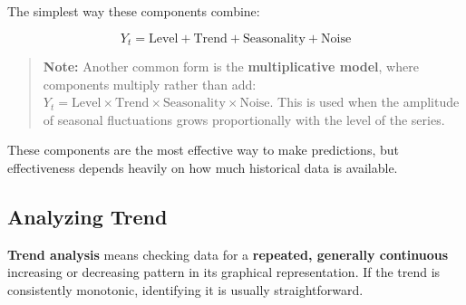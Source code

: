 \documentclass[12pt,openany]{book}
\begin{document}
The simplest way these components combine:

\begin{equation*}
    \boxed{Y_t = \text{Level} + \text{Trend} + \text{Seasonality} + \text{Noise}}
\end{equation*}


\begin{center}
\end{center}


\begin{quote}
\textbf{Note:} Another common form is the \textbf{multiplicative model}, where components multiply rather than add: \(Y_t = \text{Level} \times \text{Trend} \times \text{Seasonality} \times \text{Noise}\). This is used when the amplitude of seasonal fluctuations grows proportionally with the level of the series.\par

\end{quote}

These components are the most effective way to make predictions, but effectiveness depends heavily on how much historical data is available.

\subsection{Analyzing Trend}

\textbf{Trend analysis} means checking data for a \textbf{repeated, generally continuous} increasing or decreasing pattern in its graphical representation. If the trend is consistently monotonic, identifying it is usually straightforward.
\end{document}
